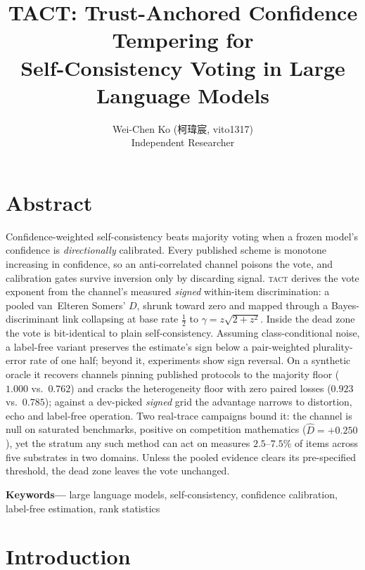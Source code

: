 \documentclass[conference]{IEEEtran}
\newcommand{\Dhat}{\widehat{D}}
\newcommand{\TACT}{\textsc{tact}}
\begin{document}
\title{TACT: Trust-Anchored Confidence Tempering for\\ Self-Consistency Voting in Large Language Models}

\author{Wei-Chen Ko (柯瑋宸, vito1317) \\ Independent Researcher}

\maketitle

\section*{Abstract}
Confidence-weighted self-consistency beats majority voting when a frozen
model's confidence is \emph{directionally} calibrated. Every published scheme is monotone increasing in confidence, so an
anti-correlated channel poisons the vote, and calibration gates survive
inversion only by discarding signal. \TACT{} derives the vote exponent from the channel's measured
\emph{signed} within-item discrimination: a pooled
van~Elteren Somers' $D$, shrunk toward zero and mapped through a
Bayes-discriminant link collapsing at base rate $\tfrac12$ to
$\gamma=z\sqrt{2+z^2}$. Inside the dead zone the vote is
bit-identical to plain self-consistency. Assuming class-conditional noise, a label-free variant preserves the estimate's sign below a
pair-weighted plurality-error rate of one half; beyond it,
experiments show sign reversal. On a synthetic oracle it recovers channels pinning published protocols to
the majority floor ($1.000$ vs.\ $0.762$) and cracks the
heterogeneity floor with zero paired losses ($0.923$ vs.\ $0.785$); against a
dev-picked \emph{signed} grid the advantage narrows to distortion, echo and
label-free operation. Two real-trace campaigns bound it: the channel is null on saturated
benchmarks, positive on competition mathematics ($\Dhat=+0.250$), yet the
stratum any such method can act on measures $2.5$--$7.5\%$ of items across five
substrates in two domains. Unless the pooled evidence clears its pre-specified threshold, the dead zone
leaves the vote unchanged.


\textbf{Keywords---}
large language models, self-consistency, confidence calibration, label-free estimation, rank statistics


\section{Introduction}
\end{document}
